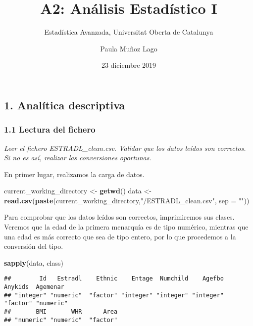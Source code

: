 \documentclass[
]{article}
\title{A2: Análisis Estadístico I}
\subtitle{Estadística Avanzada, Universitat Oberta de Catalunya}
\author{Paula Muñoz Lago}
\date{23 diciembre 2019}
\newenvironment{Shaded}{\begin{snugshade}}{\end{snugshade}}
\newcommand{\DataTypeTok}[1]{\textcolor[rgb]{0.13,0.29,0.53}{#1}}
\newcommand{\KeywordTok}[1]{\textcolor[rgb]{0.13,0.29,0.53}{\textbf{#1}}}
\newcommand{\NormalTok}[1]{#1}
\newcommand{\StringTok}[1]{\textcolor[rgb]{0.31,0.60,0.02}{#1}}
\begin{document}
\maketitle

{
\setcounter{tocdepth}{2}
\tableofcontents
}
\hypertarget{analuxedtica-descriptiva}{%
\subsection{1. Analítica descriptiva}\label{analuxedtica-descriptiva}}

\hypertarget{lectura-del-fichero}{%
\subsubsection{1.1 Lectura del fichero}\label{lectura-del-fichero}}

\emph{Leer el fichero ESTRADL\_clean.csv. Validar que los datos leídos
son correctos. Si no es así, realizar las conversiones oportunas.}

En primer lugar, realizamos la carga de datos.

\begin{Shaded}
\begin{Highlighting}[]
\NormalTok{current_working_directory <-}\StringTok{ }\KeywordTok{getwd}\NormalTok{()}
\NormalTok{data <-}\StringTok{ }\KeywordTok{read.csv}\NormalTok{(}\KeywordTok{paste}\NormalTok{(current_working_directory,}\StringTok{"/ESTRADL_clean.csv"}\NormalTok{, }\DataTypeTok{sep =} \StringTok{""}\NormalTok{))}
\end{Highlighting}
\end{Shaded}

Para comprobar que los datos leídos son correctos, imprimiremos sus
clases. Veremos que la edad de la primera menarquía es de tipo numérico,
mientras que una edad es más correcto que sea de tipo entero, por lo que
procedemos a la conversión del tipo.

\begin{Shaded}
\begin{Highlighting}[]
\KeywordTok{sapply}\NormalTok{(data, class)}
\end{Highlighting}
\end{Shaded}

\begin{verbatim}
##        Id   Estradl    Ethnic    Entage  Numchild    Agefbo   Anykids  Agemenar 
## "integer" "numeric"  "factor" "integer" "integer" "integer"  "factor" "numeric" 
##       BMI       WHR      Area 
## "numeric" "numeric"  "factor"
\end{verbatim}
\end{document}
